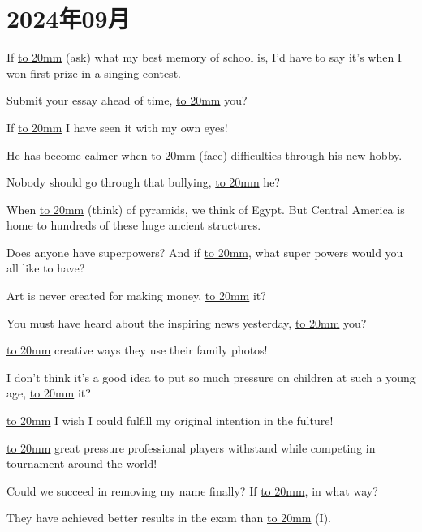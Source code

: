 \setcounter{section}{1}
\section{2024年09月}

\item {
    If \underline{\hbox to 20mm{}} (ask) what my best memory of school is, I'd have to say it's when I won first prize in a singing contest. 
} 
\item {
    Submit your essay ahead of time, \underline{\hbox to 20mm{}} you?
} 
\item {
    If \underline{\hbox to 20mm{}} I have seen it with my own eyes!
} 
\item {
    He has become calmer when \underline{\hbox to 20mm{}} (face) difficulties through his new hobby.
} 
\item {
    Nobody should go through that bullying, \underline{\hbox to 20mm{}} he?
} 
\item {
    When \underline{\hbox to 20mm{}} (think) of pyramids, we think of Egypt. But Central America is home to hundreds of these huge ancient structures.
} 
\item {
    Does anyone have superpowers? And if \underline{\hbox to 20mm{}}, what super powers would you all like to have?
} 
\item {
    Art is never created for making money, \underline{\hbox to 20mm{}} it?
} 
\item {
    You must have heard about the inspiring news yesterday,  \underline{\hbox to 20mm{}} you?
} 
\item {
    \underline{\hbox to 20mm{}} creative ways they use their family photos!
} 
\item {
    I don't think it's a good idea to put so much pressure on children at such a young age, \underline{\hbox to 20mm{}} it?
} 
\item {
    \underline{\hbox to 20mm{}} I wish I could fulfill my original intention in the fulture!
} 
\item {
    \underline{\hbox to 20mm{}} great pressure professional players withstand while competing in tournament around the world!
} 
\item {
    Could we succeed in removing my name finally? If \underline{\hbox to 20mm{}}, in what way?
} 
\item {
    They have achieved  better results in the exam than \underline{\hbox to 20mm{}} (I).
} 
